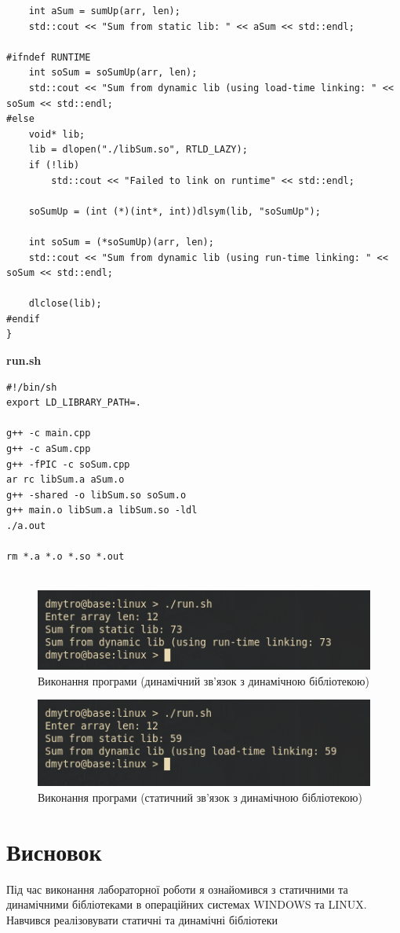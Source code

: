 \documentclass{article}
\begin{document}
\begin{normalsize}
\begin{lstlisting}
	int aSum = sumUp(arr, len);
	std::cout << "Sum from static lib: " << aSum << std::endl;
	
#ifndef RUNTIME
	int soSum = soSumUp(arr, len);
	std::cout << "Sum from dynamic lib (using load-time linking: " << soSum << std::endl;
#else
	void* lib;
	lib = dlopen("./libSum.so", RTLD_LAZY);
	if (!lib)
		std::cout << "Failed to link on runtime" << std::endl;
	
	soSumUp = (int (*)(int*, int))dlsym(lib, "soSumUp");
	
	int soSum = (*soSumUp)(arr, len);
	std::cout << "Sum from dynamic lib (using run-time linking: " << soSum << std::endl;
	
	dlclose(lib);
#endif
}

	\end{lstlisting}
	
	\noindent\textbf{run.sh}
	\begin{lstlisting}
#!/bin/sh
export LD_LIBRARY_PATH=.

g++ -c main.cpp
g++ -c aSum.cpp
g++ -fPIC -c soSum.cpp
ar rc libSum.a aSum.o
g++ -shared -o libSum.so soSum.o
g++ main.o libSum.a libSum.so -ldl
./a.out

rm *.a *.o *.so *.out
		
	\end{lstlisting}
	
		\begin{figure}[H]
		\centering
		\includegraphics[scale=0.9]{4}
		\caption{Виконання програми (динамічний зв'язок з динамічною бібліотекою)}
	\end{figure}

	\begin{figure}[H]
	\centering
	\includegraphics[scale=0.9]{5}
	\caption{Виконання програми (статичний зв'язок з динамічною бібліотекою)}
	\end{figure}
	
	\section*{Висновок}
	Під час виконання лабораторної роботи я ознайомився з статичними та динамічними бібліотеками в операційних
	системах WINDOWS та LINUX. Навчився реалізовувати статичні та динамічні
	бібліотеки
	
	 
\end{normalsize}
\end{document}
